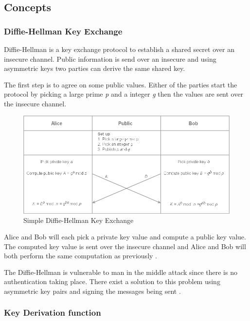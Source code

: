 \newpage

\subsection{Concepts}

\subsubsection{Diffie-Hellman Key Exchange}

Diffie-Hellman is a key exchange protocol to establish a shared secret over an insecure channel. Public information is send over an insecure and using asymmetric keys two parties can derive the same shared key.


The first step is to agree on some public values. Either of the parties start the protocol by picking a large prime \emph{p} and a integer \emph{g} then the values are sent over the insecure channel.  

\begin{figure}[H]
	\hspace*{-1cm} 
	\centering
	\includegraphics[width=14cm]{figures/dh.png}
	\caption{Simple Diffie-Hellman Key Exchange}
	\label{fig:dh}
\end{figure}

Alice and Bob will each pick a private key value and compute a public key value. The computed key value is sent over the insecure channel and Alice and Bob will both perform the same computation as previously \cite{crypto101}.


The Diffie-Hellman is vulnerable to man in the middle attack since there is no authentication taking place. There exist a solution to this problem using asymmetric key pairs and signing the messages being sent \cite{crypto101}.

\subsubsection{Key Derivation function}

